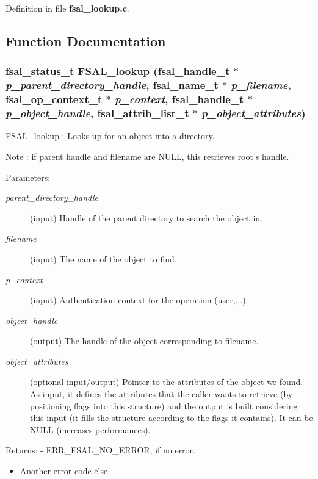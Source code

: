 Definition in file {\bf fsal\_\-lookup.c}.

\subsection{Function Documentation}
\subsubsection{\setlength{\rightskip}{0pt plus 5cm}fsal\_\-status\_\-t FSAL\_\-lookup (fsal\_\-handle\_\-t $\ast$ {\em p\_\-parent\_\-directory\_\-handle}, fsal\_\-name\_\-t $\ast$ {\em p\_\-filename}, fsal\_\-op\_\-context\_\-t $\ast$ {\em p\_\-context}, fsal\_\-handle\_\-t $\ast$ {\em p\_\-object\_\-handle}, fsal\_\-attrib\_\-list\_\-t $\ast$ {\em p\_\-object\_\-attributes})}\label{fsal__lookup_8c_a0}


FSAL\_\-lookup : Looks up for an object into a directory.

Note : if parent handle and filename are NULL, this retrieves root's handle.

\begin{Desc}
\item[Parameters:]
\begin{description}
\item[{\em parent\_\-directory\_\-handle}](input) Handle of the parent directory to search the object in. \item[{\em filename}](input) The name of the object to find. \item[{\em p\_\-context}](input) Authentication context for the operation (user,...). \item[{\em object\_\-handle}](output) The handle of the object corresponding to filename. \item[{\em object\_\-attributes}](optional input/output) Pointer to the attributes of the object we found. As input, it defines the attributes that the caller wants to retrieve (by positioning flags into this structure) and the output is built considering this input (it fills the structure according to the flags it contains). It can be NULL (increases performances).\end{description}
\end{Desc}
\begin{Desc}
\item[Returns:]- ERR\_\-FSAL\_\-NO\_\-ERROR, if no error.\begin{itemize}
\item Another error code else. \end{itemize}
\end{Desc}


